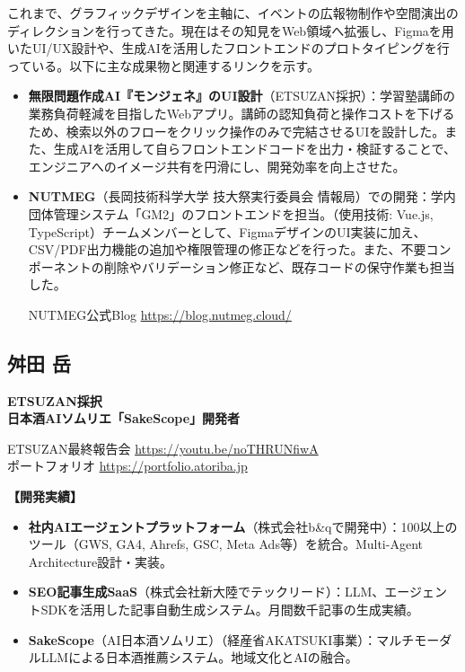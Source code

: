 \documentclass[paper=a4,fontsize=10.5bp,jafontsize=10.5bp,twocolumn]{jlreq}
\begin{document}
これまで、グラフィックデザインを主軸に、イベントの広報物制作や空間演出のディレクションを行ってきた。現在はその知見をWeb領域へ拡張し、Figmaを用いたUI/UX設計や、生成AIを活用したフロントエンドのプロトタイピングを行っている。以下に主な成果物と関連するリンクを示す。

\begin{itemize}
  \item \textbf{無限問題作成AI『モンジェネ』のUI設計}（ETSUZAN採択）：学習塾講師の業務負荷軽減を目指したWebアプリ。講師の認知負荷と操作コストを下げるため、検索以外のフローをクリック操作のみで完結させるUIを設計した。また、生成AIを活用して自らフロントエンドコードを出力・検証することで、エンジニアへのイメージ共有を円滑にし、開発効率を向上させた。

  \item \textbf{NUTMEG}（長岡技術科学大学 技大祭実行委員会 情報局）での開発：学内団体管理システム「GM2」のフロントエンドを担当。（使用技術: Vue.js, TypeScript）チームメンバーとして、FigmaデザインのUI実装に加え、CSV/PDF出力機能の追加や権限管理の修正などを行った。また、不要コンポーネントの削除やバリデーション修正など、既存コードの保守作業も担当した。

  NUTMEG公式Blog \url{https://blog.nutmeg.cloud/}
\end{itemize}

\subsection*{舛田 岳}

\noindent\textbf{ETSUZAN採択}\\
\textbf{日本酒AIソムリエ「SakeScope」開発者}

{\small\sffamily
\noindent
ETSUZAN最終報告会 \url{https://youtu.be/noTHRUNfiwA}\\
ポートフォリオ \url{https://portfolio.atoriba.jp}
}

\textbf{【開発実績】}
\begin{itemize}
  \item \textbf{社内AIエージェントプラットフォーム}（株式会社b\&qで開発中）：100以上のツール（GWS, GA4, Ahrefs, GSC, Meta Ads等）を統合。Multi-Agent Architecture設計・実装。
  \item \textbf{SEO記事生成SaaS}（株式会社新大陸でテックリード）：LLM、エージェントSDKを活用した記事自動生成システム。月間数千記事の生成実績。
  \item \textbf{SakeScope}（AI日本酒ソムリエ）（経産省AKATSUKI事業）：マルチモーダルLLMによる日本酒推薦システム。地域文化とAIの融合。
\end{itemize}
\end{document}
